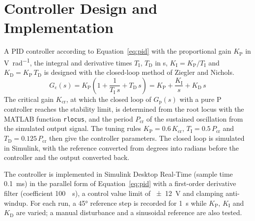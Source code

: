 \section{Controller Design and Implementation}\label{sec:design}
A PID controller according to Equation~\eqref{eq:pid} with the proportional
gain $K_\mathrm{P}$ in \unit{\volt\per\radian}, the integral and derivative times
$T_\mathrm{I}$, $T_\mathrm{D}$ in \unit{\second}, $K_\mathrm{I} = K_\mathrm{P}/T_\mathrm{I}$
and $K_\mathrm{D} = K_\mathrm{P}\,T_\mathrm{D}$ is designed with the closed-loop
method of Ziegler and Nichols\autocite{ziegler1942}.
\begin{equation}
  G_\mathrm{c}(s) = K_\mathrm{P} \left( 1 + \frac{1}{T_\mathrm{I}\,s}
  + T_\mathrm{D}\,s \right)
  = K_\mathrm{P} + \frac{K_\mathrm{I}}{s} + K_\mathrm{D}\,s
  \label{eq:pid}
\end{equation}
The critical gain $K_\mathrm{cr}$, at which the closed loop of $G_\mathrm{p}(s)$
with a pure P controller reaches the stability limit, is determined from the
root locus with the MATLAB function \texttt{rlocus}, and the period
$P_\mathrm{cr}$ of the sustained oscillation from the simulated output
signal\autocite{laboranleitung}. The tuning rules $K_\mathrm{P} = 0.6\,K_\mathrm{cr}$,
$T_\mathrm{I} = 0.5\,P_\mathrm{cr}$ and $T_\mathrm{D} = 0.125\,P_\mathrm{cr}$
then give the controller parameters\autocite{ziegler1942}. The closed loop is
simulated in Simulink, with the reference converted from degrees into radians
before the controller and the output converted back\autocite{laboranleitung}.

\label{sec:implementation}
The controller is implemented in Simulink Desktop Real-Time (sample time
\qty{0.1}{\milli\second}) in the parallel form of Equation~\eqref{eq:pid} with a
first-order derivative filter (coefficient \qty{100}{\per\second}), a control
value limit of \qty{\pm 12}{\volt} and clamping anti-windup. For each run, a
\ang{45} reference step is recorded for \qty{1}{\second} while $K_\mathrm{P}$,
$K_\mathrm{I}$ and $K_\mathrm{D}$ are varied; a manual disturbance and a
sinusoidal reference are also tested.

